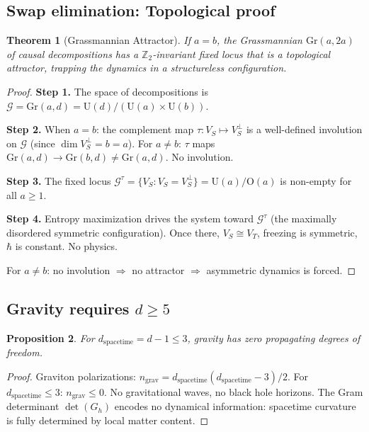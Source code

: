 \documentclass[12pt]{article}
\newtheorem{theorem}{Theorem}[section]
\newtheorem{proposition}[theorem]{Proposition}
\theoremstyle{remark}
\theoremstyle{definition}
\begin{document}
\subsection{Swap elimination: Topological proof}

\begin{theorem}[Grassmannian Attractor]
\label{thm:grassmann}
If $a = b$, the Grassmannian $\text{Gr}(a, 2a)$ of causal decompositions has a $\mathbb{Z}_2$-invariant fixed locus that is a topological attractor, trapping the dynamics in a structureless configuration.
\end{theorem}

\begin{proof}
\textbf{Step 1.}
The space of decompositions is $\mathcal{G} = \text{Gr}(a, d) = \text{U}(d)/(\text{U}(a) \times \text{U}(b))$.

\textbf{Step 2.}
When $a = b$: the complement map $\tau: V_S \mapsto V_S^\perp$ is a well-defined involution on $\mathcal{G}$ (since $\dim V_S^\perp = b = a$). For $a \neq b$: $\tau$ maps $\text{Gr}(a, d) \to \text{Gr}(b, d) \neq \text{Gr}(a, d)$. No involution.

\textbf{Step 3.}
The fixed locus $\mathcal{G}^\tau = \{V_S : V_S = V_S^\perp\} = \text{U}(a)/\text{O}(a)$ is non-empty for all $a \geq 1$.

\textbf{Step 4.}
Entropy maximization drives the system toward $\mathcal{G}^\tau$ (the maximally disordered symmetric configuration). Once there, $V_S \cong V_T$, freezing is symmetric, $\hbar$ is constant. No physics.

For $a \neq b$: no involution $\Rightarrow$ no attractor $\Rightarrow$ asymmetric dynamics is forced.
\end{proof}

\subsection{Gravity requires $d \geq 5$}

\begin{proposition}
For $d_\text{spacetime} = d - 1 \leq 3$, gravity has zero propagating degrees of freedom.
\end{proposition}

\begin{proof}
Graviton polarizations: $n_\text{grav} = d_\text{spacetime}(d_\text{spacetime} - 3)/2$. For $d_\text{spacetime} \leq 3$: $n_\text{grav} \leq 0$. No gravitational waves, no black hole horizons. The Gram determinant $\det(G_h)$ encodes no dynamical information: spacetime curvature is fully determined by local matter content.
\end{proof}
\end{document}
